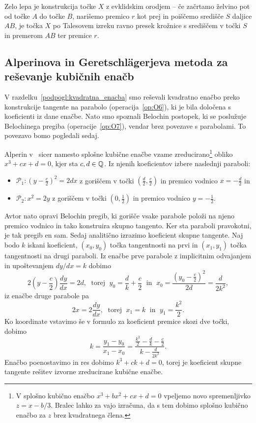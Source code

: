 \begin{opomba}
    Zelo lepa je konstrukcija točke $X$ z evklidskim orodjem -- če začrtamo želvino pot od točke $A$ do točke $B$, narišemo premico $r$ kot prej in poiščemo središče $S$ daljice $AB$, je točka $X$ po Talesovem izreku ravno presek krožnice s središčem v točki $S$ in premerom $AB$ ter premice $r$.
\end{opomba}

\subsection{Alperinova in Geretschlägerjeva metoda za reševanje kubičnih enačb}
\label{podpogl:alperin}

V razdelku~\ref{podpogl:kvadratna_enacba} smo reševali kvadratno enačbo preko konstrukcije tangente na parabolo (operacija~\ref{op:O6}), ki je bila določena s koeficienti iz dane enačbe. Nato smo spoznali Belochin postopek, ki se poslužuje Belochinega pregiba (operacije~\ref{op:O7}), vendar brez povezave s parabolami. To povezavo bomo pogledali sedaj.

Alperin v~\cite[str.\ 129]{alperin2000} sicer namesto splošne kubične enačbe vzame zreducirano\footnote{V splošno kubično enačbo $x^3 + bx^2 + cx + d = 0$ vpeljemo novo spremenljivko $z = x - b/3$. Bralec lahko za vajo izračuna, da s tem dobimo splošno kubično enačbo za $z$ brez kvadratnega člena.} obliko $x^3 + cx + d = 0$, kjer sta $c, d \in \mathbb Q$. Iz njenih koeficientov izbere naslednji paraboli:
\begin{itemize}
    \item $\mathcal{P}_1: \left(y - \frac{c}{2}\right)^2 = 2dx$ z goriščem v točki $(\frac{d}{2}, \frac{c}{2})$ in premico vodnico $x = -\frac{d}{2}$ in
    \item $\mathcal{P}_2:  x^2 = 2y$ z goriščem v točki $(0, \frac{1}{2})$ in premico vodnico $y = -\frac{1}{2}$.
\end{itemize}
Avtor nato opravi Belochin pregib, ki gorišče vsake parabole položi na njeno premico vodnico in tako konstruira skupno tangento. Ker sta paraboli pravokotni, je tak pregib en sam.
Sedaj analitično izrazimo koeficient skupne tangente. Naj bodo $k$ iskani koeficient, $(x_0, y_0)$ točka tangentnosti na prvi in $(x_1, y_1)$ točka tangentnosti na drugi paraboli. Iz enačbe prve parabole z implicitnim odvajanjem in upoštevanjem $dy/dx = k$ dobimo
$$ 2\left(y - \frac{c}{2}\right) \frac{dy}{dx} = 2d, \; \text{ torej } \; y_0 = \frac{d}{k} + \frac{c}{2} \; \text{ in } \; x_0 = \frac{\left(y_0 - \frac{c}{2}\right)^2}{2d} = \frac{d}{2k^2},$$
iz enačbe druge parabole pa
$$ 2x = 2\frac{dy}{dx}, \; \text{ torej } \; x_1 = k \; \text{ in } \; y_1 = \frac{k^2}{2}. $$
Ko koordinate vstavimo še v formulo za koeficient premice skozi dve točki, dobimo
$$ k = \frac{y_1 - y_0}{x_1 - x_0} = \frac{\frac{k^2}{2} - \frac{d}{k} - \frac{c}{2}}{k - \frac{d}{2k^2}}.
$$
Enačbo poenostavimo in res dobimo $k^3 + ck + d = 0$, torej je koeficient skupne tangente rešitev izvorne zreducirane kubične enačbe.

